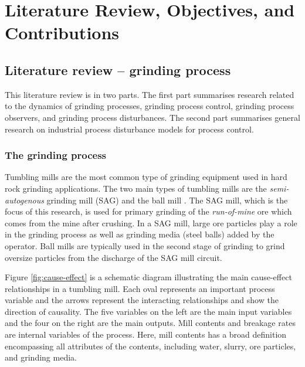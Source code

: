 \chapter{Literature Review, Objectives, and Contributions}
\label{chap-lit-review}

\section{Literature review – grinding process}

This literature review is in two parts. The first part summarises research related to the dynamics of grinding processes, grinding process control, grinding process observers, and grinding process disturbances. The second part summarises general research on industrial process disturbance models for process control.

\subsection{The grinding process}

Tumbling mills are the most common type of grinding equipment used in hard rock grinding applications. The two main types of tumbling mills are the \textit{semi-autogenous} grinding mill (SAG) and the ball mill \citep{king_chapter_2012}. The SAG mill, which is the focus of this research, is used for primary grinding of the \textit{run-of-mine} ore which comes from the mine after crushing. In a SAG mill, large ore particles play a role in the grinding process as well as grinding media (steel balls) added by the operator. Ball mills are typically used in the second stage of grinding to grind oversize particles from the discharge of the SAG mill circuit.

Figure \ref{fig:cause-effect} is a schematic diagram illustrating the main cause-effect relationships in a tumbling mill. Each oval represents an important process variable and the arrows represent the interacting relationships and show the direction of causality. The five variables on the left are the main input variables and the four on the right are the main outputs. Mill contents and breakage rates are internal variables of the process. Here, mill contents has a broad definition encompassing all attributes of the contents, including water, slurry, ore particles, and grinding media.

